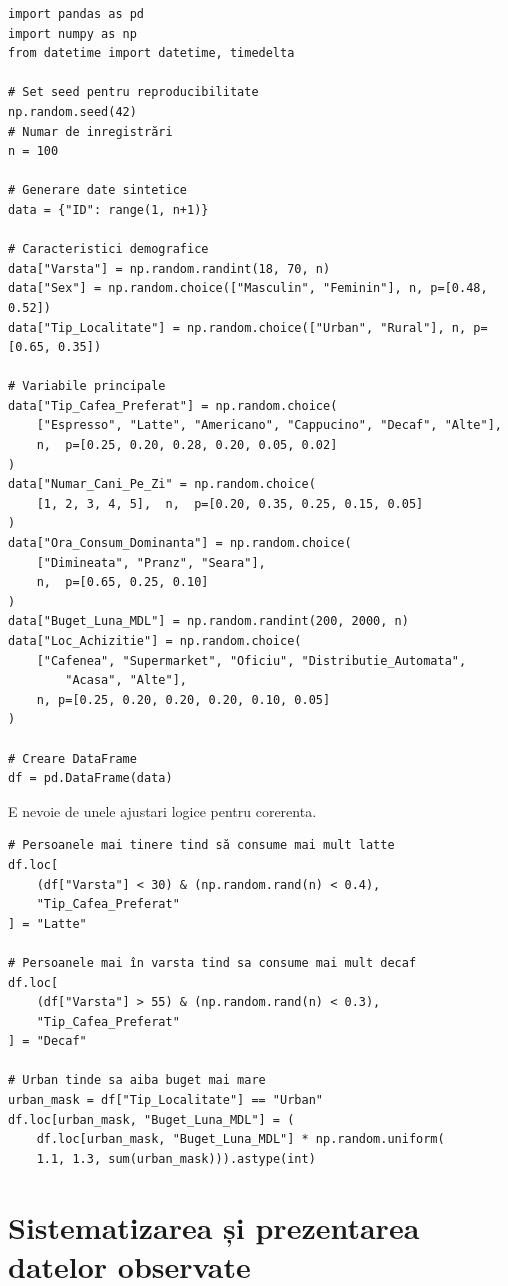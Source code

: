 \documentclass[12pt,a4paper]{report}
\begin{document}
\begin{verbatim}
import pandas as pd
import numpy as np
from datetime import datetime, timedelta

# Set seed pentru reproducibilitate
np.random.seed(42)
# Numar de inregistrări
n = 100

# Generare date sintetice
data = {"ID": range(1, n+1)}

# Caracteristici demografice
data["Varsta"] = np.random.randint(18, 70, n)
data["Sex"] = np.random.choice(["Masculin", "Feminin"], n, p=[0.48, 0.52])
data["Tip_Localitate"] = np.random.choice(["Urban", "Rural"], n, p=[0.65, 0.35])

# Variabile principale
data["Tip_Cafea_Preferat"] = np.random.choice(
    ["Espresso", "Latte", "Americano", "Cappucino", "Decaf", "Alte"], 
    n,  p=[0.25, 0.20, 0.28, 0.20, 0.05, 0.02]
)
data["Numar_Cani_Pe_Zi" = np.random.choice(
    [1, 2, 3, 4, 5],  n,  p=[0.20, 0.35, 0.25, 0.15, 0.05]
)
data["Ora_Consum_Dominanta"] = np.random.choice(
    ["Dimineata", "Pranz", "Seara"], 
    n,  p=[0.65, 0.25, 0.10]
)
data["Buget_Luna_MDL"] = np.random.randint(200, 2000, n)
data["Loc_Achizitie"] = np.random.choice(
    ["Cafenea", "Supermarket", "Oficiu", "Distributie_Automata",
        "Acasa", "Alte"],
    n, p=[0.25, 0.20, 0.20, 0.20, 0.10, 0.05]
)

# Creare DataFrame
df = pd.DataFrame(data)

\end{verbatim}

\newpage

E nevoie de unele ajustari logice pentru corerenta.

\begin{verbatim}
# Persoanele mai tinere tind să consume mai mult latte
df.loc[
    (df["Varsta"] < 30) & (np.random.rand(n) < 0.4),
    "Tip_Cafea_Preferat"
] = "Latte"

# Persoanele mai în varsta tind sa consume mai mult decaf
df.loc[
    (df["Varsta"] > 55) & (np.random.rand(n) < 0.3),
    "Tip_Cafea_Preferat"
] = "Decaf"

# Urban tinde sa aiba buget mai mare
urban_mask = df["Tip_Localitate"] == "Urban"
df.loc[urban_mask, "Buget_Luna_MDL"] = (
    df.loc[urban_mask, "Buget_Luna_MDL"] * np.random.uniform(
    1.1, 1.3, sum(urban_mask))).astype(int)

\end{verbatim}

\section{Sistematizarea și prezentarea datelor observate}
\end{document}
